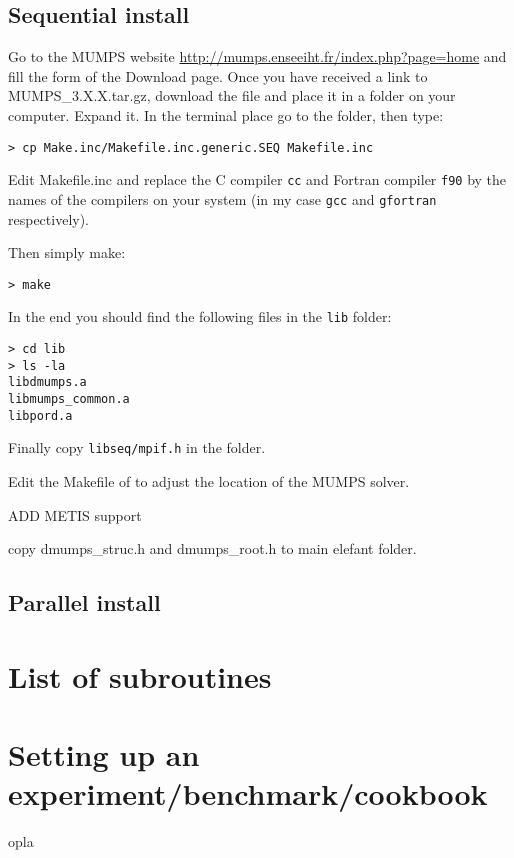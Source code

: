 \subsection{Sequential install}

Go to the MUMPS website \url{http://mumps.enseeiht.fr/index.php?page=home} and 
fill the form of the Download page. 
Once you have received a link to {\filenamefont MUMPS\_3.X.X.tar.gz}, download
the file and place it in a folder on your computer. Expand it. 
In the terminal place go to the folder, then type:
\begin{verbatim}
> cp Make.inc/Makefile.inc.generic.SEQ Makefile.inc
\end{verbatim}
Edit {\filenamefont Makefile.inc} and replace the C compiler {\tt cc} 
and Fortran compiler {\tt f90} by the names of the compilers on 
your system (in my case {\tt gcc} and {\tt gfortran} respectively).

Then simply make:
\begin{verbatim}
> make 
\end{verbatim}
In the end you should find the following files in the {\tt lib} folder:
\begin{verbatim}
> cd lib
> ls -la
libdmumps.a
libmumps_common.a
libpord.a
\end{verbatim}
Finally copy {\tt libseq/mpif.h} in the \elefant folder.

Edit the Makefile of \elefant to adjust the location of the MUMPS solver.

ADD METIS support


copy dmumps\_struc.h and dmumps\_root.h to main elefant folder.


\subsection{Parallel install}


\section{List of subroutines}



\section{Setting up an experiment/benchmark/cookbook}

opla

